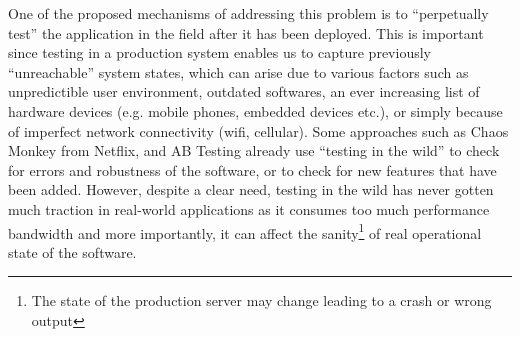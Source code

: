 One of the proposed mechanisms of addressing this problem is to ``perpetually test''\cite{perpetual} the application in the field after it has been deployed. 
This is important since testing in a production system enables us to capture previously ``unreachable'' system states, which can arise due to various factors such as unpredictible user environment, outdated softwares, an ever increasing list of hardware devices (e.g. mobile phones, embedded devices etc.), or simply because of imperfect network connectivity (wifi, cellular).
Some approaches such as Chaos Monkey\cite{chaosmonkey} from Netflix, and AB Testing\cite{abtesting} already use ``testing in the wild'' to check for errors and robustness of the software, or to check for new features that have been added.  
However, despite a clear need, testing in the wild has never gotten much traction in real-world applications as it consumes too much performance bandwidth and more importantly, it can affect the sanity\footnote{The state of the production server may change leading to a crash or wrong output} of real operational state of the software.




